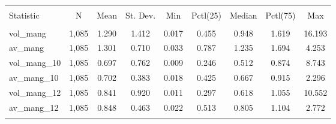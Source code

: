 
\begin{table}[!htbp] \centering 
  \caption{} 
  \label{} 
\begin{tabular}{@{\extracolsep{5pt}}lcccccccc} 
\\[-1.8ex]\hline 
\hline \\[-1.8ex] 
Statistic & \multicolumn{1}{c}{N} & \multicolumn{1}{c}{Mean} & \multicolumn{1}{c}{St. Dev.} & \multicolumn{1}{c}{Min} & \multicolumn{1}{c}{Pctl(25)} & \multicolumn{1}{c}{Median} & \multicolumn{1}{c}{Pctl(75)} & \multicolumn{1}{c}{Max} \\ 
\hline \\[-1.8ex] 
vol\_mang & 1,085 & 1.290 & 1.412 & 0.017 & 0.455 & 0.948 & 1.619 & 16.193 \\ 
av\_mang & 1,085 & 1.301 & 0.710 & 0.033 & 0.787 & 1.235 & 1.694 & 4.253 \\ 
vol\_mang\_10 & 1,085 & 0.697 & 0.762 & 0.009 & 0.246 & 0.512 & 0.874 & 8.743 \\ 
av\_mang\_10 & 1,085 & 0.702 & 0.383 & 0.018 & 0.425 & 0.667 & 0.915 & 2.296 \\ 
vol\_mang\_12 & 1,085 & 0.841 & 0.920 & 0.011 & 0.297 & 0.618 & 1.055 & 10.552 \\ 
av\_mang\_12 & 1,085 & 0.848 & 0.463 & 0.022 & 0.513 & 0.805 & 1.104 & 2.772 \\ 
\hline \\[-1.8ex] 
\end{tabular} 
\end{table} 
